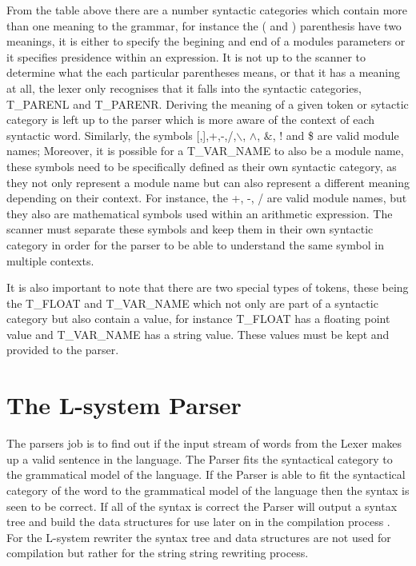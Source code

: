 \noindent
From the table above there are a number syntactic categories which contain more than one meaning to the grammar, for instance the ( and ) parenthesis have two meanings, it is either to specify the begining and end of a modules parameters or it specifies presidence within an expression.  It is not up to the scanner to determine what the each particular parentheses means, or that it has a meaning at all, the lexer only recognises that it falls into the syntactic categories, T\_PARENL and T\_PARENR. Deriving the meaning of a given token or sytactic category is left up to the parser which is more aware of the context of each syntactic word. Similarly, the symbols [,],+,-,/,$\backslash$, $\land$, $\&$, ! and \$ are valid module names; Moreover, it is possible for a T\_VAR\_NAME to also be a module name, these symbols need to be specifically defined as their own syntactic category, as they not only represent a module name but can also represent a different meaning depending on their context. For instance, the +, -, / are valid module names, but they also are mathematical symbols used within an arithmetic expression. The scanner must separate these symbols and keep them in their own syntactic category in order for the parser to be able to understand the same symbol in multiple contexts. 


It is also important to note that there are two special types of tokens, these being the T\_FLOAT and T\_VAR\_NAME which not only are part of a syntactic category but also contain a value, for instance T\_FLOAT has a floating point value and T\_VAR\_NAME has a string value. These values must be kept and provided to the parser.

\section{The L-system Parser} \label{parser}

The parsers job is to find out if the input stream of words from the \gls{Lexer} makes up a valid sentence in the language. The \gls{Parser} fits the syntactical category to the grammatical model of the language. If the \gls{Parser} is able to fit the syntactical category of the word to the grammatical model of the language then the syntax is seen to be correct. If all of the syntax is correct the \gls{Parser} will output a syntax tree and build the data structures for use later on in the compilation process \cite{cooper2011engineering}. For the L-system rewriter the syntax tree and data structures are not used for compilation but rather for the string string rewriting process.

